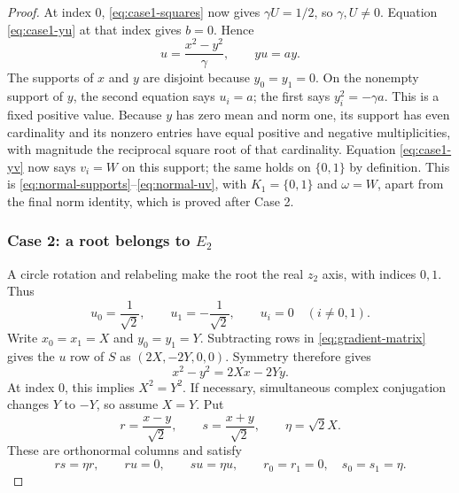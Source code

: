 \documentclass[11pt,reqno]{amsart}
\theoremstyle{definition}
\theoremstyle{remark}
\numberwithin{equation}{section}
\begin{document}
\begin{proof}
At index $0$, \eqref{eq:case1-squares} now gives $\gamma U=1/2$,
so $\gamma,U\ne0$. Equation \eqref{eq:case1-yu} at that index
gives $b=0$. Hence
\begin{equation}\label{eq:case1-reduced}
 u=\frac{x^2-y^2}{\gamma},\qquad yu=a y.
\end{equation}
The supports of $x$ and $y$ are disjoint because $y_0=y_1=0$.
On the nonempty support of $y$, the second equation says $u_i=a$;
the first says $y_i^2=-\gamma a$. This is a fixed positive value.
Because $y$ has zero mean and norm one, its support has even
cardinality and its nonzero entries have equal positive and negative
multiplicities, with magnitude the reciprocal square root of that
cardinality. Equation \eqref{eq:case1-yv} now says $v_i=W$ on
this support; the same holds on $\{0,1\}$ by definition.
This is \eqref{eq:normal-supports}--\eqref{eq:normal-uv}, with
$K_1=\{0,1\}$ and $\omega=W$, apart from the final norm identity,
which is proved after Case 2.

\subsubsection*{Case 2: a root belongs to $E_2$}
A circle rotation and relabeling make the root the real $z_2$
axis, with indices $0,1$. Thus
\[
 u_0=\frac1{\sqrt2},\qquad u_1=-\frac1{\sqrt2},\qquad
 u_i=0\quad(i\ne0,1).
\]
Write $x_0=x_1=X$ and $y_0=y_1=Y$.
Subtracting rows in \eqref{eq:gradient-matrix} gives the $u$ row
of $S$ as $(2X,-2Y,0,0)$. Symmetry therefore gives
\[
 x^2-y^2=2Xx-2Yy.
\]
At index $0$, this implies $X^2=Y^2$. If necessary, simultaneous
complex conjugation changes $Y$ to $-Y$, so assume $X=Y$.
Put
\begin{equation}\label{eq:rs-def}
 r=\frac{x-y}{\sqrt2},\qquad
 s=\frac{x+y}{\sqrt2},\qquad \eta=\sqrt2X.
\end{equation}
These are orthonormal columns and satisfy
\begin{equation}\label{eq:case2-basic}
 rs=\eta r,\qquad ru=0,\qquad su=\eta u,
 \qquad r_0=r_1=0,\quad s_0=s_1=\eta.
\end{equation}


\end{proof}
\end{document}
